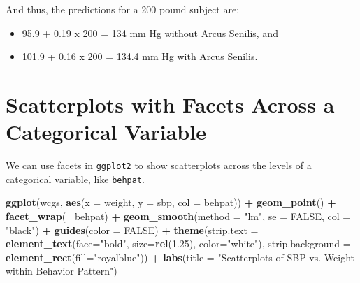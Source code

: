 \documentclass[
]{book}
\newenvironment{Shaded}{\begin{snugshade}}{\end{snugshade}}
\newcommand{\DataTypeTok}[1]{\textcolor[rgb]{0.13,0.29,0.53}{#1}}
\newcommand{\FloatTok}[1]{\textcolor[rgb]{0.00,0.00,0.81}{#1}}
\newcommand{\KeywordTok}[1]{\textcolor[rgb]{0.13,0.29,0.53}{\textbf{#1}}}
\newcommand{\NormalTok}[1]{#1}
\newcommand{\OperatorTok}[1]{\textcolor[rgb]{0.81,0.36,0.00}{\textbf{#1}}}
\newcommand{\OtherTok}[1]{\textcolor[rgb]{0.56,0.35,0.01}{#1}}
\newcommand{\StringTok}[1]{\textcolor[rgb]{0.31,0.60,0.02}{#1}}
\begin{document}
And thus, the predictions for a 200 pound subject are:

\begin{itemize}
\item
  95.9 + 0.19 x 200 = 134 mm Hg without Arcus Senilis, and
\item
  101.9 + 0.16 x 200 = 134.4 mm Hg with Arcus Senilis.
\end{itemize}

\hypertarget{scatterplots-with-facets-across-a-categorical-variable}{%
\section{Scatterplots with Facets Across a Categorical Variable}\label{scatterplots-with-facets-across-a-categorical-variable}}

We can use facets in \texttt{ggplot2} to show scatterplots across the levels of a categorical variable, like \texttt{behpat}.

\begin{Shaded}
\begin{Highlighting}[]
\KeywordTok{ggplot}\NormalTok{(wcgs, }\KeywordTok{aes}\NormalTok{(}\DataTypeTok{x =}\NormalTok{ weight, }\DataTypeTok{y =}\NormalTok{ sbp, }\DataTypeTok{col =}\NormalTok{ behpat)) }\OperatorTok{+}
\StringTok{    }\KeywordTok{geom_point}\NormalTok{() }\OperatorTok{+}
\StringTok{    }\KeywordTok{facet_wrap}\NormalTok{(}\OperatorTok{~}\StringTok{ }\NormalTok{behpat) }\OperatorTok{+}
\StringTok{    }\KeywordTok{geom_smooth}\NormalTok{(}\DataTypeTok{method =} \StringTok{"lm"}\NormalTok{, }\DataTypeTok{se =} \OtherTok{FALSE}\NormalTok{, }\DataTypeTok{col =} \StringTok{"black"}\NormalTok{) }\OperatorTok{+}
\StringTok{    }\KeywordTok{guides}\NormalTok{(}\DataTypeTok{color =} \OtherTok{FALSE}\NormalTok{) }\OperatorTok{+}
\StringTok{    }\KeywordTok{theme}\NormalTok{(}\DataTypeTok{strip.text =} \KeywordTok{element_text}\NormalTok{(}\DataTypeTok{face=}\StringTok{"bold"}\NormalTok{, }\DataTypeTok{size=}\KeywordTok{rel}\NormalTok{(}\FloatTok{1.25}\NormalTok{), }\DataTypeTok{color=}\StringTok{"white"}\NormalTok{),}
          \DataTypeTok{strip.background =} \KeywordTok{element_rect}\NormalTok{(}\DataTypeTok{fill=}\StringTok{"royalblue"}\NormalTok{)) }\OperatorTok{+}
\StringTok{    }\KeywordTok{labs}\NormalTok{(}\DataTypeTok{title =} \StringTok{"Scatterplots of SBP vs. Weight within Behavior Pattern"}\NormalTok{)}
\end{Highlighting}
\end{Shaded}
\end{document}
